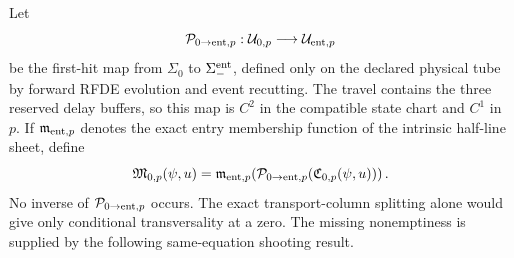 Let
\begin{equation}
 \mathcal P_{0\to{\rm ent},p}:\mathcal U_{0,p}
       \longrightarrow\mathcal U_{{\rm ent},p}       \label{eq:anchor-forward-central-entry-holonomy}
\end{equation}
be the first-hit map from \(\Sigma_0\) to
\(\Sigma_-^{\rm ent}\), defined only on the declared physical tube by
forward RFDE evolution and event recutting.  The travel contains the three
reserved delay buffers, so this map is \(C^2\) in the compatible state chart
and \(C^1\) in \(p\).  If \(\mathfrak m_{{\rm ent},p}\) denotes the exact
entry membership function of the intrinsic half-line sheet, define
\begin{equation}
 \mathfrak M_{0,p}(\psi,u)
 =\mathfrak m_{{\rm ent},p}\!\left(
    \mathcal P_{0\to{\rm ent},p}
       (\mathfrak C_{0,p}(\psi,u))\right).           \label{eq:anchor-forward-preimage-membership}
\end{equation}
No inverse of \(\mathcal P_{0\to{\rm ent},p}\) occurs.  The exact
transport-column splitting alone would give only conditional transversality
at a zero.  The missing nonemptiness is supplied by the following
same-equation shooting result.

